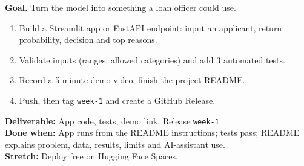 \begin{tcolorbox}[enhanced,breakable,colback=white,colframe=sun,boxrule=0.8pt,arc=2pt,left=7pt,right=7pt,top=4pt,bottom=4pt,
  title={\bfseries Saturday --- Mini product and demo\hfill\normalfont\small 3 h},coltitle=white,colbacktitle=sun,fonttitle=\small]
\textbf{Goal.} Turn the model into something a loan officer could use.
\begin{enumerate}[itemsep=1pt,topsep=2pt]
  \item Build a Streamlit app or FastAPI endpoint: input an applicant, return probability, decision and top reasons.
  \item Validate inputs (ranges, allowed categories) and add 3 automated tests.
  \item Record a 5-minute demo video; finish the project README.
  \item Push, then tag \texttt{week-1} and create a GitHub Release.
\end{enumerate}
\textbf{\color{dataC}Deliverable:} App code, tests, demo link, Release \texttt{week-1}\\
\textbf{\color{navy}Done when:} App runs from the README instructions; tests pass; README explains problem, data, results, limits and AI-assistant use.\\
\textbf{\color{skillC}Stretch:} Deploy free on Hugging Face Spaces.
\end{tcolorbox}

